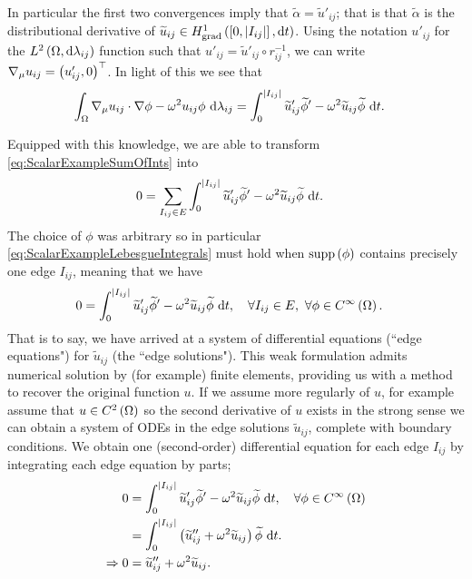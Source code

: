 In particular the first two convergences imply that $\widetilde{\alpha}=\widetilde{u}'_{ij}$; that is that $\widetilde{\alpha}$ is the distributional derivative of $\widetilde{u}_{ij}\in H^1_\mathrm{grad}\left( \left[ 0,\lvert I_{ij} \rvert \right], \mathrm{d}t \right)$.
Using the notation $u'_{ij}$ for the $L^{2}\left( \Omega,\mathrm{d}\lambda_{ij} \right)$ function such that $u'_{ij} = \widetilde{u}'_{ij}\circ r_{ij}^{-1}$, we can write $\nabla_\mu u_{ij} = \left( u'_{ij}, 0 \right)^{\top}$.
In light of this we see that
\begin{align*}
	\int_{\Omega}\nabla_\mu u_{ij} \cdot \nabla\phi - \omega^2 u_{ij}\phi \ \mathrm{d}\lambda_{ij}
	&= \int_0^{\lvert I_{ij} \rvert}\widetilde{u}'_{ij}\widetilde{\phi}' - \omega^2\widetilde{u}_{ij}\widetilde{\phi} \ \mathrm{d} t.
\end{align*}

Equipped with this knowledge, we are able to transform \eqref{eq:ScalarExampleSumOfInts} into
\begin{align} \label{eq:ScalarExampleLebesgueIntegrals}
	0 &= \sum_{I_{ij}\in E}\int_0^{\lvert I_{ij} \rvert}\widetilde{u}'_{ij}\widetilde{\phi}' - \omega^2\widetilde{u}_{ij}\widetilde{\phi} \ \mathrm{d} t.
\end{align}
The choice of $\phi$ was arbitrary so in particular \eqref{eq:ScalarExampleLebesgueIntegrals} must hold when $\mathrm{supp}\left( \phi \right)$ contains precisely one edge $I_{ij}$, meaning that we have
\begin{align*}
	0 &= \int_0^{\lvert I_{ij} \rvert}\widetilde{u}'_{ij}\widetilde{\phi}' - \omega^2\widetilde{u}_{ij}\widetilde{\phi} \ \mathrm{d} t, \quad \forall I_{ij}\in E, \ \forall \phi\in C^{\infty}\left( \Omega \right).
\end{align*}
That is to say, we have arrived at a system of differential equations (``edge equations") for $\widetilde{u}_{ij}$ (the ``edge solutions").
This weak formulation admits numerical solution by (for example) finite elements, providing us with a method to recover the original function $u$.
If we assume more regularly of $u$, for example assume that $u\in C^2\left( \Omega \right)$ so the second derivative of $u$ exists in the strong sense we can obtain a system of ODEs in the edge solutions $\widetilde{u}_{ij}$, complete with boundary conditions.
We obtain one (second-order) differential equation for each edge $I_{ij}$ by integrating each edge equation by parts;
\begin{align*}
	0 &= \int_0^{\lvert I_{ij} \rvert}\widetilde{u}'_{ij}\widetilde{\phi}' - \omega^2\widetilde{u}_{ij}\widetilde{\phi} \ \mathrm{d} t, \quad \forall\phi\in C^{\infty}\left( \Omega \right) \\
	&= \int_0^{\lvert I_{ij} \rvert} \left( \widetilde{u}''_{ij} + \omega^2\widetilde{u}_{ij} \right)\widetilde{\phi} \ \mathrm{d} t. \\
	\Rightarrow 0 &= \widetilde{u}''_{ij} + \omega^2\widetilde{u}_{ij}.
\end{align*}

